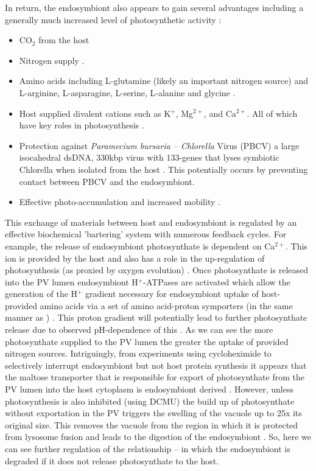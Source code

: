 In return, the endosymbiont also appears to gain several advantages including a generally much increased level of photosynthetic activity \citep{Sommaruga2009}:
\begin{itemize}
    \item CO$_{2}$ from the host \citep{Parker1926}
    \item Nitrogen supply \citep{Johnson2011}.
    \item Amino acids including L-glutamine (likely an important nitrogen source) \citep{Reisser1992} and L-arginine, L-asparagine, L-serine, L-alanine and glycine \citep{Kato2009a}.
    \item Host supplied divalent cations such as K$^{+}$, Mg$^{2+}$, and Ca$^{2+}$. All of which have key roles in photosynthesis \citep{Kato2009a}.
    \item Protection against \textit{Paramecium bursaria – Chlorella} Virus (PBCV) \citep{Yashchenko2012} a large isocahedral dsDNA, 330kbp virus with 133-genes that lyses symbiotic Chlorella when isolated from the host \citep{VanEtten1983}.  This potentially occurs by preventing contact between PBCV and the endosymbiont.
    \item Effective photo-accumulation and increased mobility \citep{Niess1982}.
\end{itemize}
%
This exchange of materials between host and endosymbiont is regulated by an effective biochemical 'bartering' system with numerous feedback cycles. 
For example, the release of endosymbiont photosynthate is dependent on Ca$^{2+}$.  
This ion is provided by the host and also has a role in the up-regulation of photosynthesis (as proxied by oxygen evolution) \citep{Kato2009a}.     
Once photosynthate is released into the PV lumen endosymbiont H$^{+}$-ATPases are activated which allow the generation of the H$^{+}$ gradient necessary for endosymbiont uptake of host-provided amino acids via a set of amino acid-proton symporters (in the same manner as \citep{Camoni2006}) \citep{Kato2009a}.
This proton gradient will potentially lead to further photosynthate release due to observed pH-dependence of this \citep{Kato2009a}. 
As we can see the more photosynthate supplied to the PV lumen the greater the uptake of provided nitrogen sources.  
Intriguingly, from experiments using cycloheximide to selectively interrupt endosymbiont but not host protein synthesis it appears that the maltose transporter that is responsible for export of photosynthate from the PV lumen into the host cytoplasm is endosymbiont derived \citep{Muscatine1967}. 
However, unless photosynthesis is also inhibited (using DCMU) the build up of photosynthate without exportation in the PV triggers the swelling of the vacuole up to 25x its original size.  
This removes the vacuole from the region in which it is protected from lysosome fusion and leads to the digestion of the endosymbiont \citep{Kodama2009a}.
So, here we can see further regulation of the relationship – in which the endosymbiont is degraded if it does not release photosynthate to the host.

